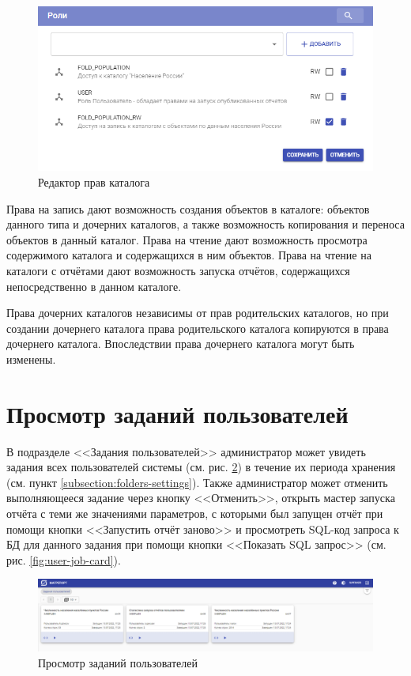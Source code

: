 \documentclass[../user-manual.tex]{subfiles}
\begin{document}
	\begin{figure}[h]
		\centering
		\includegraphics[width=\graphicswidth]{img/07-folder-rights-editor.png}
		\caption{Редактор прав каталога}
		\label{fig:folder-rights-editor}
	\end{figure}

	Права на запись дают возможность создания объектов в каталоге: объектов данного типа и дочерних каталогов, а также возможность копирования и переноса объектов в данный каталог. Права на чтение дают возможность просмотра содержимого каталога и содержащихся в ним объектов. Права на чтение на каталоги с отчётами дают возможность запуска отчётов, содержащихся непосредственно в данном каталоге.
	
	Права дочерних каталогов независимы от прав родительских каталогов, но при создании дочернего каталога права родительского каталога копируются в права дочернего каталога. Впоследствии права дочернего каталога могут быть изменены.
	
	\section{Просмотр заданий пользователей}
	
	В подразделе <<Задания пользователей>> администратор может увидеть задания всех пользователей системы (см. рис. \ref{fig:user-jobs}) в течение их периода хранения (см. пункт \ref{subsection:folders-settings}). Также администратор может отменить выполняющееся задание через кнопку <<Отменить>>, открыть мастер запуска отчёта с теми же значениями параметров, с которыми был запущен отчёт при помощи кнопки <<Запустить отчёт заново>> и просмотреть SQL-код запроса к БД для данного задания при помощи кнопки <<Показать SQL запрос>> (см. рис. \ref{fig:user-job-card}).
	
	\begin{figure}[h]
		\centering
		\includegraphics[width=\graphicswidth]{img/08-user-jobs.png}
		\caption{Просмотр заданий пользователей}
		\label{fig:user-jobs}
	\end{figure}
	
\end{document}
